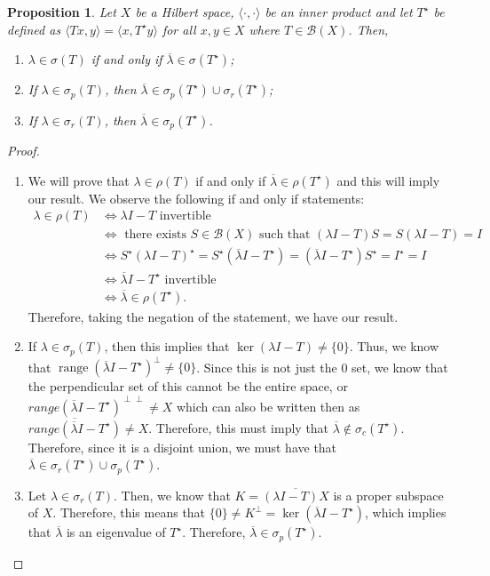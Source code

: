 \documentclass[12pt]{article}
\newtheorem{proposition}{Proposition}
\newcommand{\B}{\mathscr{B}}
\newcommand{\la}{\langle}
\newcommand{\ra}{\rangle}
\DeclareMathOperator{\range}{range}
\newcommand{\ov}{\overline}
\newcommand{\Ts}{T^{\star}}
\begin{document}
\begin{proposition}
Let $X$ be a Hilbert space, $\la \cdot, \cdot \ra$ be an inner product and let $\Ts$ be defined as $\la Tx, y \ra = \la x, \Ts y \ra$ for all $x, y \in X$ where $T \in \B(X)$. Then,
\begin{enumerate}[topsep=-15pt]
\item[(a)] $\lambda \in \sigma(T)$ if and only if $\ov{\lambda} \in \sigma(\Ts)$;
\item[(b)] If $\lambda \in \sigma_p(T)$, then $\ov{\lambda} \in \sigma_p(\Ts) \cup \sigma_r(\Ts)$;
\item[(c)] If $\lambda \in \sigma_r(T)$, then $\ov{\lambda} \in \sigma_p(\Ts)$.
\end{enumerate}
\end{proposition}
\vspace{-25pt}
\begin{proof}
\begin{enumerate}[itemsep=0pt]
\item[(a)] We will prove that $\lambda \in \rho(T)$ if and only if $\ov{\lambda} \in \rho(\Ts)$ and this will imply our result. We observe the following if and only if statements:
\begin{align*}
\lambda \in \rho(T) & \Longleftrightarrow \lambda I - T \text{ invertible } \\
&\Longleftrightarrow \text{ there exists } S \in \B(X) \text{ such that } (\lambda I - T)S = S(\lambda I - T) = I \\
& \Longleftrightarrow S^{\star}(\lambda I - T)^{\star} = S^{\star} (\ov{\lambda} I - \Ts) = (\ov{\lambda} I - \Ts) S^{\star} = I^{\star} = I \\
& \Longleftrightarrow \ov{\lambda} I - \Ts \text{ invertible } \\
& \Longleftrightarrow \ov{\lambda} \in \rho(\Ts).
\end{align*}
Therefore, taking the negation of the statement, we have our result. 
\item[(b)] If $\lambda \in \sigma_p(T)$, then this implies that $\ker(\lambda I - T) \neq \{ 0 \}$. Thus, we know that $\range(\ov{\lambda} I - \Ts)^{\perp} \neq \{ 0 \}$. Since this is not just the 0 set, we know that the perpendicular set of this cannot be the entire space, or $range(\ov{\lambda} I - \Ts)^{\perp \perp} \neq X$ which can also be written then as $\ov{range(\ov{\lambda} I - \Ts)} \neq X$. Therefore, this must imply that $\ov{\lambda} \not\in \sigma_c(\Ts)$. Therefore, since it is a disjoint union, we must have that $\ov{\lambda} \in \sigma_r(\Ts) \cup \sigma_p(\Ts)$.
\item[(c)] Let $\lambda \in \sigma_r(T)$. Then, we know that $K = \ov{(\lambda I - T) X}$ is a proper subspace of $X$. Therefore, this means that $\{ 0 \} \neq K^{\perp} = \ker(\ov{\lambda} I - \Ts)$, which implies that $\ov{\lambda}$ is an eigenvalue of $\Ts$. Therefore, $\ov{\lambda} \in \sigma_p(\Ts)$.  
\end{enumerate}
\end{proof}
\end{document}
